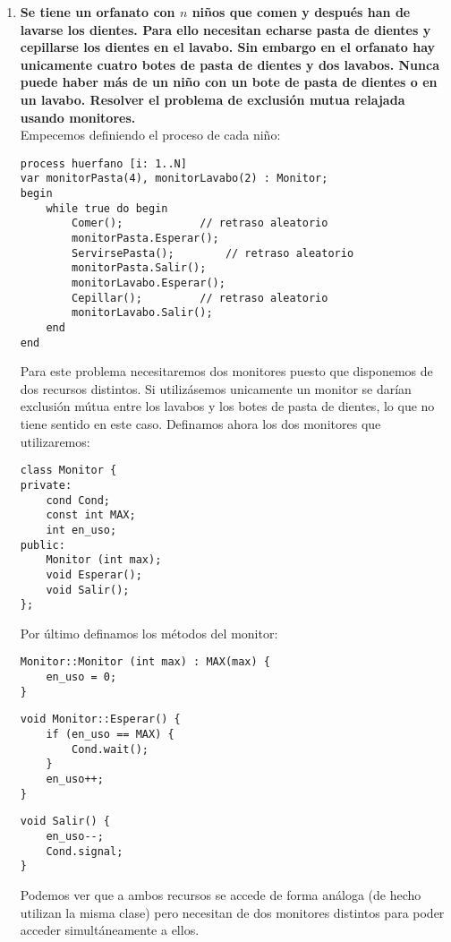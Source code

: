 \documentclass[11pt,a4paper]{article}
\begin{document}
\begin{enumerate}
\item \large{\textbf{Se tiene un orfanato con $n$ niños que comen y después han de lavarse los dientes. Para ello necesitan echarse pasta de dientes y cepillarse los dientes en el lavabo. Sin embargo en el orfanato hay unicamente cuatro botes de pasta de dientes y dos lavabos. Nunca puede haber más de un niño con un bote de pasta de dientes o en un lavabo. Resolver el problema de exclusión mutua relajada usando monitores.}} \\

Empecemos definiendo el proceso de cada niño:

\begin{lstlisting}
process huerfano [i: 1..N]
var monitorPasta(4), monitorLavabo(2) : Monitor;
begin
	while true do begin
		Comer(); 			// retraso aleatorio
		monitorPasta.Esperar();
		ServirsePasta();		// retraso aleatorio
		monitorPasta.Salir();
		monitorLavabo.Esperar();
		Cepillar();			// retraso aleatorio
		monitorLavabo.Salir();
	end
end
\end{lstlisting}

Para este problema necesitaremos dos monitores puesto que disponemos de dos recursos distintos. Si utilizásemos unicamente un monitor se darían exclusión mútua entre los lavabos y los botes de pasta de dientes, lo que no tiene sentido en este caso. Definamos ahora los dos monitores que utilizaremos:

\begin{lstlisting}
class Monitor {
private:
	cond Cond;
	const int MAX;
	int en_uso;
public:
	Monitor (int max);
	void Esperar();
	void Salir();
};
\end{lstlisting}

Por último definamos los métodos del monitor:

\begin{lstlisting}
Monitor::Monitor (int max) : MAX(max) {
	en_uso = 0;
}
\end{lstlisting}

\begin{lstlisting}
void Monitor::Esperar() {
	if (en_uso == MAX) {
		Cond.wait();
	}
	en_uso++;
}
\end{lstlisting}

\begin{lstlisting}
void Salir() {
	en_uso--;
	Cond.signal;
}
\end{lstlisting}

Podemos ver que a ambos recursos se accede de forma análoga (de hecho utilizan la misma clase) pero necesitan de dos monitores distintos para poder acceder simultáneamente a ellos.


\end{enumerate}
\end{document}
